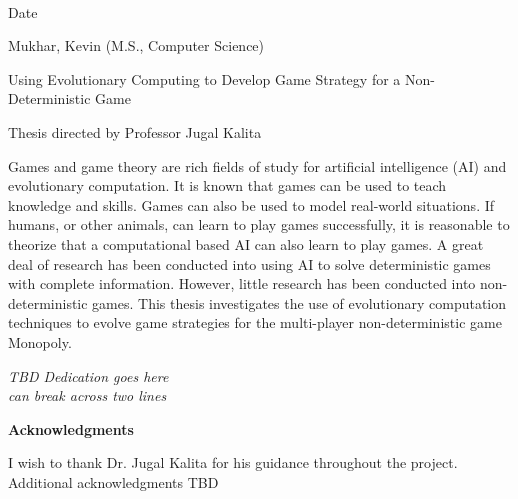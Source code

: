 \begin{flushright}
	\vspace{2.0pc}
	\makebox[2in]{\hrulefill} \\[-1.0pc]
	Date
\end{flushright}


\newpage

\setlength{\parindent}{0in}
Mukhar, Kevin (M.S., Computer Science) 

Using Evolutionary Computing to
Develop Game Strategy for a Non-Deterministic Game 

Thesis directed by Professor Jugal Kalita

\vspace{28pt}
\setlength{\parindent}{.4in}

Games and game theory are rich fields of study for artificial intelligence (AI)
and evolutionary computation. It is known that games can be used to teach
knowledge and skills. Games can also be used to model real-world situations. If
humans, or other animals, can learn to play games successfully, it is
reasonable to theorize that a computational based AI can also learn to play
games. A great deal of research has been conducted into using AI to solve
deterministic games with complete information. However, little research has
been conducted into non-deterministic games. This thesis investigates the use of
evolutionary computation techniques to evolve game strategies for the
multi-player non-deterministic game Monopoly.

\newpage

\parbox{5.0in}{
	\vspace{2.0in}
	\begin{center}
		{\large{\emph{TBD Dedication goes here \\ can break across two lines}}}
	\end{center}
}


\newpage
\begin{center}
	{\large{\bf Acknowledgments}}
\end{center}
\setlength{\parindent}{.4in}

I wish to thank Dr. Jugal Kalita for his guidance throughout the project.
Additional acknowledgments TBD